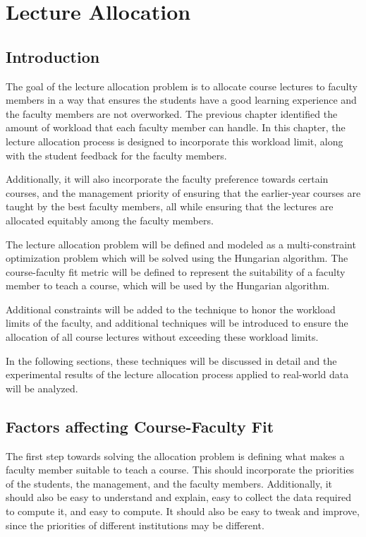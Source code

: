 
\chapter{Lecture Allocation}

\section{Introduction}

The goal of the lecture allocation problem is to allocate course lectures to faculty members in a way that ensures the students have a good learning experience and the faculty members are not overworked. The previous chapter identified the amount of workload that each faculty member can handle. In this chapter, the lecture allocation process is designed to incorporate this workload limit, along with the student feedback for the faculty members.

Additionally, it will also incorporate the faculty preference towards certain courses, and the management priority of ensuring that the earlier-year courses are taught by the best faculty members, all while ensuring that the lectures are allocated equitably among the faculty members.

The lecture allocation problem will be defined and modeled as a multi-constraint optimization problem which will be solved using the Hungarian algorithm. The course-faculty fit metric will be defined to represent the suitability of a faculty member to teach a course, which will be used by the Hungarian algorithm.

Additional constraints will be added to the technique to honor the workload limits of the faculty, and additional techniques will be introduced to ensure the allocation of all course lectures without exceeding these workload limits.

In the following sections, these techniques will be discussed in detail and the experimental results of the lecture allocation process applied to real-world data will be analyzed.

\section{Factors affecting Course-Faculty Fit}

The first step towards solving the allocation problem is defining what makes a faculty member suitable to teach a course. This should incorporate the priorities of the students, the management, and the faculty members. Additionally, it should also be easy to understand and explain, easy to collect the data required to compute it, and easy to compute. It should also be easy to tweak and improve, since the priorities of different institutions may be different.



